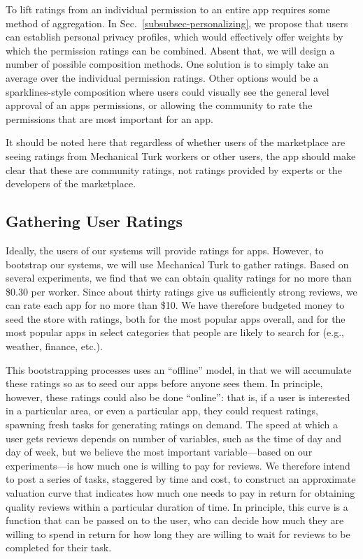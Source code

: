 \documentclass[11pt]{article}
\begin{document}
To lift ratings from an individual permission to an entire app
requires some method of aggregation. In 
Sec.~\ref{subsubsec-personalizing}, we propose that users
can establish personal privacy profiles, which would effectively offer
weights by which the permission ratings can be combined. Absent that, we will design a
number of possible composition methods. One solution is to simply take
an average over the individual permission ratings. Other options would
be a sparklines-style composition where users could visually see the
general level approval of an apps permissions, or allowing the
community to rate the permissions that are most important for an app.

It should be noted here that regardless of whether users of the
marketplace are seeing ratings from Mechanical Turk workers or other
users, the app should make clear that these are community ratings, not
ratings provided by experts or the developers of the marketplace.


\subsection{Gathering User Ratings}
\label{subsec-gather-ratings}

Ideally, the users of our systems will provide ratings for
apps. However, 
to bootstrap our systems, we will use Mechanical Turk to gather
ratings. Based on several experiments, we find that we can obtain
quality ratings for no more than \$0.30 per worker. Since about thirty
ratings give us sufficiently strong reviews, we can rate each
app for no more than \$10. We have therefore budgeted money to
seed the store with ratings, both for the most popular apps overall,
and for the most popular apps in select categories that people are
likely to search for (e.g., weather, finance, etc.).

This bootstrapping processes uses an ``offline'' model, in that we
will accumulate these ratings so as to seed our apps before anyone
sees them. In principle, however, these ratings could also be done
``online'': that is, if a user is interested in a particular area, or
even a particular app, they could request ratings, spawning fresh tasks for
generating ratings on demand. The speed at which a user gets reviews
depends on number of variables, such as the time of day and day of
week, but we believe the most important variable---based on our
experiments---is how much one is willing to pay for reviews. We
therefore intend to post a series of tasks, staggered by time and
cost, to construct an approximate valuation curve that indicates how
much one needs to pay in return for obtaining quality reviews within a
particular duration of time. In principle, this curve is a function
that can be passed on to the user, who can decide how much they are
willing to spend in return for how long they are willing to wait for
reviews to be completed for their task.
\end{document}
